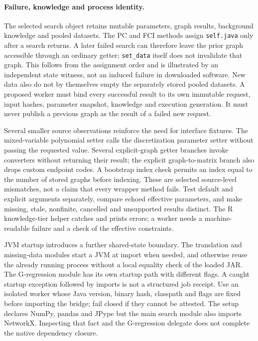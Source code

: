 \paragraph{Failure, knowledge and process identity.}
The selected search object retains mutable parameters, graph results,
background knowledge and pooled datasets. The PC and FCI methods assign
\texttt{self.java} only after a search returns. A later failed search can
therefore leave the prior graph accessible through an ordinary getter;
\texttt{set\_data} itself does not invalidate that graph. This follows from
the assignment order and is illustrated by an independent state witness,
not an induced failure in downloaded software. New data also do not by
themselves empty the separately stored pooled datasets. A proposed worker
must bind every successful result to its own immutable request, input hashes,
parameter snapshot, knowledge and execution generation. It must never publish
a previous graph as the result of a failed new request.
\citep{exec24_pytetrad_source,exec24_pytetrad_choice}

Several smaller source observations reinforce the need for interface fixtures.
The mixed-variable polynomial setter calls the discretization parameter setter
without passing the requested value. Several explicit-graph getter branches
invoke converters without returning their result; the explicit graph-to-matrix
branch also drops custom endpoint codes. A bootstrap index check permits an
index equal to the number of stored graphs before indexing. These are selected
source-level mismatches, not a claim that every wrapper method fails. Test
default and explicit arguments separately, compare echoed effective parameters,
and make missing, stale, nonfinite, cancelled and unsupported results distinct.
The R knowledge-tier helper catches and prints errors; a worker needs a
machine-readable failure and a check of the effective constraints.
\citep{exec24_pytetrad_source}

JVM startup introduces a further shared-state boundary. The translation and
missing-data modules start a JVM at import when needed, and otherwise reuse
the already running process without a local equality check of the loaded JAR.
The G-regression module has its own startup path with different flags. A caught
startup exception followed by imports is not a structured job receipt. Use an
isolated worker whose Java version, binary hash, classpath and flags are fixed
before importing the bridge; fail closed if they cannot be attested. The setup
declares NumPy, pandas and JPype but the main search module also imports
NetworkX. Inspecting that fact and the G-regression delegate does not complete
the native dependency closure.~\citep{exec24_pytetrad_source}

